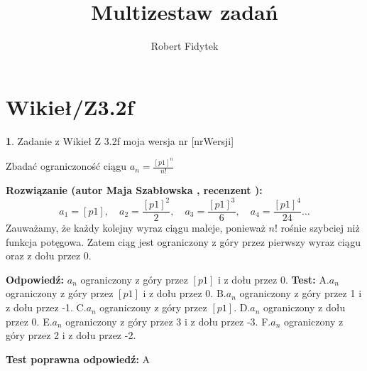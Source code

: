 \documentclass[12pt, a4paper]{article}
\title{Multizestaw zadań}
\author{Robert Fidytek}
\date{}
\theoremstyle{definition} %
\newtheorem{zad}{}
\newcommand{\kategoria}[1]{\section{#1}} %
\newcommand{\zadStart}[1]{\begin{zad}#1\newline} %
\newcommand{\zadStop}{\end{zad}}   %
\newcommand{\rozwStart}[2]{\noindent \textbf{Rozwiązanie (autor #1 , recenzent #2): }\newline} %
\newcommand{\rozwStop}{\newline}                                            %
\newcommand{\odpStart}{\noindent \textbf{Odpowiedź:}\newline}    %
\newcommand{\odpStop}{\newline}                                             %
\newcommand{\testStart}{\noindent \textbf{Test:}\newline} %
\newcommand{\testStop}{\newline} %
\newcommand{\kluczStart}{\noindent \textbf{Test poprawna odpowiedź:}\newline} %
\newcommand{\kluczStop}{\newline} %
\begin{document}
\maketitle


\kategoria{Wikieł/Z3.2f}
\zadStart{Zadanie z Wikieł Z 3.2f moja wersja nr [nrWersji]}


Zbadać ograniczoność ciągu $a_{n}=\frac{[p1]^{n}}{n!}$

\zadStop

\rozwStart{Maja Szabłowska}{}
$$a_{1}=[p1], \quad a_{2}=\frac{[p1]^{2}}{2}, \quad a_{3}=\frac{[p1]^{3}}{6}, \quad a_{4}=\frac{[p1]^{4}}{24} \ldots$$
Zauważamy, że każdy kolejny wyraz ciągu maleje, ponieważ $n!$ rośnie szybciej niż funkcja potęgowa. Zatem ciąg jest ograniczony z góry przez pierwszy wyraz ciągu oraz z dołu przez 0.
\rozwStop


\odpStart
$a_{n}$ ograniczony z góry przez $[p1]$ i z dołu przez 0.
\odpStop
\testStart
A.$a_{n}$ ograniczony z góry przez $[p1]$ i z dołu przez 0.
B.$a_{n}$ ograniczony z góry przez 1 i z dołu przez -1.
C.$a_{n}$ ograniczony z góry przez $[p1]$.
D.$a_{n}$ ograniczony z dołu przez 0.
E.$a_{n}$ ograniczony z góry przez 3 i z dołu przez -3.
F.$a_{n}$ ograniczony z góry przez 2 i z dołu przez -2.


\testStop
\kluczStart
A
\kluczStop
\end{document}

